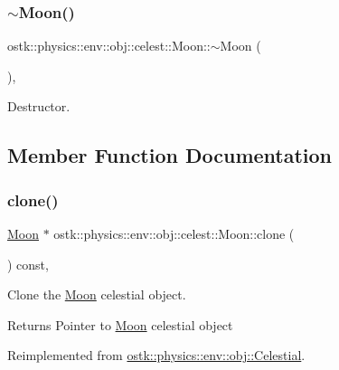 \subsubsection{\texorpdfstring{$\sim$\+Moon()}{~Moon()}}
{\footnotesize\ttfamily ostk\+::physics\+::env\+::obj\+::celest\+::\+Moon\+::$\sim$\+Moon (\begin{DoxyParamCaption}{ }\end{DoxyParamCaption})\hspace{0.3cm}{\ttfamily [override]}, {\ttfamily [virtual]}}



Destructor. 



\subsection{Member Function Documentation}
\mbox{\label{classostk_1_1physics_1_1env_1_1obj_1_1celest_1_1_moon_adcfeda7b73d32df67f5b38c05ca9351a}} 
\subsubsection{\texorpdfstring{clone()}{clone()}}
{\footnotesize\ttfamily \hyperlink{classostk_1_1physics_1_1env_1_1obj_1_1celest_1_1_moon}{Moon} $\ast$ ostk\+::physics\+::env\+::obj\+::celest\+::\+Moon\+::clone (\begin{DoxyParamCaption}{ }\end{DoxyParamCaption}) const\hspace{0.3cm}{\ttfamily [override]}, {\ttfamily [virtual]}}



Clone the \hyperlink{classostk_1_1physics_1_1env_1_1obj_1_1celest_1_1_moon}{Moon} celestial object. 

\begin{DoxyReturn}{Returns}
Pointer to \hyperlink{classostk_1_1physics_1_1env_1_1obj_1_1celest_1_1_moon}{Moon} celestial object 
\end{DoxyReturn}


Reimplemented from \hyperlink{classostk_1_1physics_1_1env_1_1obj_1_1_celestial_a87c6f3ec3c0ec9758ae52e3edc3fc5df}{ostk\+::physics\+::env\+::obj\+::\+Celestial}.

